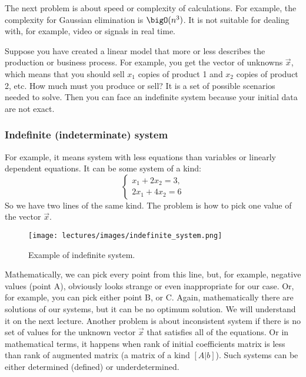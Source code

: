     \par
    The next problem is about speed or complexity of calculations. For example, the complexity for Gaussian elimination is $\bigO(n^3)$. It is not suitable for dealing with, for example, video or signals in real time.
    \par 
    Suppose you have created a linear model that more or less describes the production or business process. For example, you get the vector of unknowns $\vec{x}$, which means that you should sell $x_1$ copies of product 1 and $x_2$ copies of product 2, etc. How much must you produce or sell? It is a set of possible scenarios needed to solve. Then you can face an indefinite system because your initial data are not exact.
    \subsubsection*{Indefinite (indeterminate) system}
    For example, it means system with less equations than variables or linearly dependent equations. It can be some system of a kind:
    \[
        \left\{ \begin{array}{c}
            x_1 + 2x_2 = 3,\\
            2x_1 + 4x_2 = 6
        \end{array}
            \right.  
    \]
    So we have two lines of the same kind. The problem is how to pick one value of the vector $\vec{x}$. 
    \begin{wrapfigure}[12]{l}{0.5\columnwidth}
        \texttt{[image: lectures/images/indefinite\_system.png]}
        \caption*{\scriptsize{Example of indefinite system.}}
        \label{fig:indefinite_system}
    \end{wrapfigure}
    Mathematically, we can pick every point from this line, but, for example, negative values (point A), obviously looks strange or even inappropriate for our case. Or, for example, you can pick either point B, or C. Again, mathematically there are solutions of our systems, but it can be no optimum solution. We will understand it on the next lecture. Another problem is about inconsistent system if there is no set of values for the unknown vector $\vec{x}$ that satisfies all of the equations. Or in mathematical terms, it happens when rank of initial coefficients matrix is less than rank of augmented matrix (a matrix of a kind $[A|b]$). Such systems can be either determined (defined) or underdetermined.
